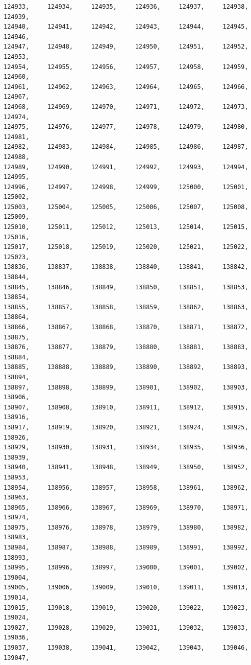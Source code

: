 \documentclass[a4paper,11pt]{report}
\begin{document}
\begin{verbatim}
124933,     124934,     124935,     124936,     124937,     124938,     124939,
124940,     124941,     124942,     124943,     124944,     124945,     124946,
124947,     124948,     124949,     124950,     124951,     124952,     124953,
124954,     124955,     124956,     124957,     124958,     124959,     124960,
124961,     124962,     124963,     124964,     124965,     124966,     124967,
124968,     124969,     124970,     124971,     124972,     124973,     124974,
124975,     124976,     124977,     124978,     124979,     124980,     124981,
124982,     124983,     124984,     124985,     124986,     124987,     124988,
124989,     124990,     124991,     124992,     124993,     124994,     124995,
124996,     124997,     124998,     124999,     125000,     125001,     125002,
125003,     125004,     125005,     125006,     125007,     125008,     125009,
125010,     125011,     125012,     125013,     125014,     125015,     125016,
125017,     125018,     125019,     125020,     125021,     125022,     125023,
138836,     138837,     138838,     138840,     138841,     138842,     138844,
138845,     138846,     138849,     138850,     138851,     138853,     138854,
138855,     138857,     138858,     138859,     138862,     138863,     138864,
138866,     138867,     138868,     138870,     138871,     138872,     138875,
138876,     138877,     138879,     138880,     138881,     138883,     138884,
138885,     138888,     138889,     138890,     138892,     138893,     138894,
138897,     138898,     138899,     138901,     138902,     138903,     138906,
138907,     138908,     138910,     138911,     138912,     138915,     138916,
138917,     138919,     138920,     138921,     138924,     138925,     138926,
138929,     138930,     138931,     138934,     138935,     138936,     138939,
138940,     138941,     138948,     138949,     138950,     138952,     138953,
138954,     138956,     138957,     138958,     138961,     138962,     138963,
138965,     138966,     138967,     138969,     138970,     138971,     138974,
138975,     138976,     138978,     138979,     138980,     138982,     138983,
138984,     138987,     138988,     138989,     138991,     138992,     138993,
138995,     138996,     138997,     139000,     139001,     139002,     139004,
139005,     139006,     139009,     139010,     139011,     139013,     139014,
139015,     139018,     139019,     139020,     139022,     139023,     139024,
139027,     139028,     139029,     139031,     139032,     139033,     139036,
139037,     139038,     139041,     139042,     139043,     139046,     139047,

\end{verbatim}
\end{document}
